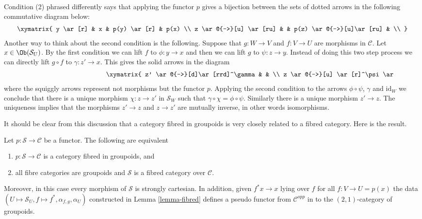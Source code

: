 \noindent
Condition (2) phrased differently says that
applying the functor $p$ gives a bijection between the sets
of dotted arrows in the following commutative diagram below:
$$
\xymatrix{
y \ar[r] & x & p(y) \ar[r] & p(x) \\
z \ar@{-->}[u] \ar[ru] & & p(z) \ar@{-->}[u]\ar[ru] & \\
}
$$
Another way to think about the second condition is the following.
Suppose that $g : W \to V$ and $f : V \to U$ are morphisms in $\mathcal{C}$.
Let $x \in \Ob(\mathcal{S}_U)$. By the first condition we can lift
$f$ to $ \phi : y \to x$ and then we can lift $g$ to $\psi : z \to y$.
Instead of doing this two step process we can directly lift $g \circ f$ to
$\gamma : z' \to x$. This gives the solid arrows in the diagram
\begin{equation}
\label{equation-fibred-groupoids}
\vcenter{
\xymatrix{
z' \ar@{-->}[d]\ar[rrd]^\gamma & & \\
z \ar@{-->}[u] \ar[r]^\psi \ar@{~>}[d]^p &
y \ar[r]^\phi \ar@{~>}[d]^p &
x \ar@{~>}[d]^p
\\
W \ar[r]^g & V \ar[r]^f & U \\
}
}
\end{equation}
where the squiggly arrows represent not morphisms but the functor $p$.
Applying the second condition to the arrows $\phi \circ \psi$, $\gamma$
and $\text{id}_W$ we conclude that there is a unique morphism
$\chi : z \to z'$ in $\mathcal{S}_W$ such that
$\gamma \circ \chi = \phi \circ \psi$. Similarly there is a unique morphism
$z' \to z$. The uniqueness implies that the morphisms $z' \to z$ and
$z\to z'$ are mutually inverse, in other words isomorphisms.

\medskip\noindent
It should be clear from this discussion that a
category fibred in groupoids is very closely related
to a fibred category. Here is the result.

\begin{lemma}
\label{lemma-fibred-groupoids}
Let $p : \mathcal{S} \to \mathcal{C}$ be a functor.
The following are equivalent
\begin{enumerate}
\item $p : \mathcal{S} \to \mathcal{C}$ is a category
fibred in groupoids, and
\item all fibre categories are groupoids and
$\mathcal{S}$ is a fibred category over $\mathcal{C}$.
\end{enumerate}
Moreover, in this case every morphism of $\mathcal{S}$ is
strongly cartesian. In addition, given $f^\ast x \to x$
lying over $f$ for all $f: V \to U = p(x)$ the data
$(U \mapsto \mathcal{S}_U, f \mapsto f^*, \alpha_{f, g}, \alpha_U)$
constructed in Lemma \ref{lemma-fibred}
defines a pseudo functor from $\mathcal{C}^{opp}$ in to
the $(2, 1)$-category of groupoids.
\end{lemma}

